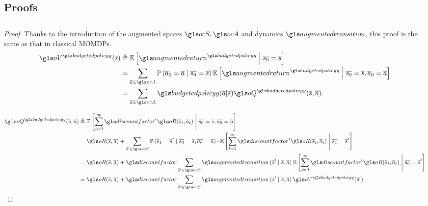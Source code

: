 \begin{subappendices}

\section{Proofs}
\label{sec:proofs}
\subsection{}

\begin{proof}
	Thanks to the introduction of the augmented spaces $\ocS, \ocA$ and dynamics $\augmentedtransition$, this proof is the same as that in classical \glspl{MOMDP}.
	\begin{align*}
	\oV^{\budgetedpolicy}(\os) &\eqdef \expectedvalue\left[ \augmentedreturn^{\budgetedpolicy} \condbar \ov{s_0} = \os\right] \\
	&=\sum_{\oa\in\ocA} \probability{\oa_0 = \oa \condbar\ov{s_0} = \os} \expectedvalue\left[ \augmentedreturn^{\budgetedpolicy} \condbar \ov{s_0} = \os, \oa_0 = \oa\right]\\
	&= \sum_{\oa\in\ocA} \budgetedpolicy(\oa | \os) \oQ^{\budgetedpolicy}(\os,\oa).
	\end{align*}
	
	\begin{align*}
	\oQ^{\budgetedpolicy}(\os, \oa) &\eqdef \expectedvalue\left[\sum_{t=0}^\infty \discountfactor^t \augmentedreward(\os_t, \oa_t)\condbar \ov{s_0} = \os, \ov{a_0} = \oa\right] \\
	&= \augmentedreward(\os, \oa) + \sum_{\os'\in\ocS}\probability{\os_1 = \os' \condbar\ov{s_0} = \os, \ov{a_0} = \oa}\cdot \expectedvalue\left[\sum_{t=1}^\infty \discountfactor^t \augmentedreward(\os_t, \oa_t)\condbar \ov{s_1} = \os'\right] \\
	&= \augmentedreward(\os, \oa) + \discountfactor\sum_{\os'\in\ocS}\augmentedtransition\left(\os' \condbar\os, \oa\right) \expectedvalue\left[\sum_{t=0}^\infty \discountfactor^t \augmentedreward(\os_t, \oa_t) \condbar \ov{s_0} = \os'\right] \\
	&= \augmentedreward(\os, \oa) + \discountfactor\sum_{\os'\in\ocS}\augmentedtransition\left(\os' \condbar\os, \oa\right) \oV^{\budgetedpolicy}(\os').
	\end{align*}
	

\end{proof}
\end{subappendices}
